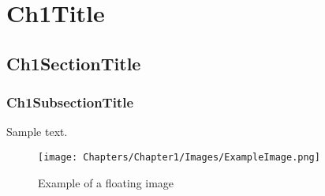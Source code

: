 \chapter{Ch1Title}

 \section{Ch1SectionTitle}
	\subsection{Ch1SubsectionTitle}
		\par Sample text.

		\begin{figure}[H]
			\centering
			\texttt{[image: Chapters/Chapter1/Images/ExampleImage.png]}
			\caption{Example of a floating image}
			\label{fig:ExampleImage}
		\end{figure}
